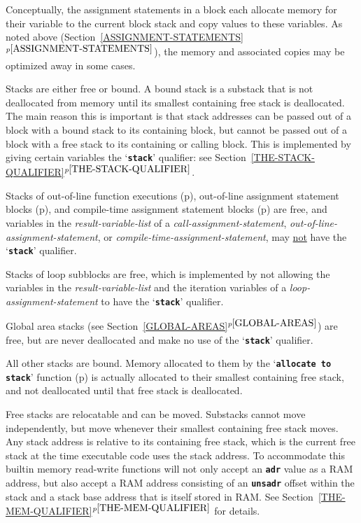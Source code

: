 \documentclass[12pt]{article}
\newcommand{\TT}[1]{{\tt \bfseries #1}}
\newcommand{\itemref}[1]{\ref{#1}$^{p\pageref{#1}}$}
\newcommand{\pagref}[1]{p\pageref{#1}}
\begin{document}
Conceptually, the assignment statements in a block each allocate memory for
their variable to the current block stack and copy values to these
variables.  As noted above (Section~\itemref{ASSIGNMENT-STATEMENTS}),
the memory and associated copies may be
optimized away in some cases.

Stacks are either free or bound.\label{FREE-STACK}
A bound stack is a substack that is
not deallocated from memory until its smallest containing free stack is
deallocated.  The main reason this is important is that stack addresses
can be passed out of a block with a bound stack to its containing block,
but cannot be passed out of a block with a free stack to its containing
or calling block.  This is implemented by giving certain
variables the `\TT{stack}' qualifier: see
Section~\itemref{THE-STACK-QUALIFIER}.

Stacks of out-of-line function executions
(\pagref{OUT-OF-LINE-FUNCTIONS}),
out-of-line assignment statement blocks
(\pagref{OUT-OF-LINE-ASSIGNMENT-STATEMENTS}),
and
compile-time assignment statement blocks
(\pagref{COMPILE-TIME-ASSIGNMENT-STATEMENTS})
are free, and variables in the {\em result-variable-list}
of a {\em call-assignment-statement},
{\em out-of-line-assignment-statement}, or
{\em compile-time-assignment-statement},
may \underline{not} have the `\TT{stack}' qualifier.

Stacks of loop subblocks are free,
which is implemented by not
allowing the variables in the {\em result-variable-list}
and the iteration variables
of a {\em loop-assignment-statement} to have the `\TT{stack}'
qualifier.

Global area stacks (see Section~\itemref{GLOBAL-AREAS}) are free,
but are never deallocated and make no use of the `\TT{stack}'
qualifier.

All other stacks are bound.  Memory allocated to them
by the `\TT{allocate to stack}' function (\pagref{ALLOCATE-TO-STACK})
is actually
allocated to their smallest containing free stack, and not deallocated
until that free stack is deallocated.

Free stacks are relocatable and can be moved.
Substacks cannot move independently,
but move whenever their smallest containing free stack moves.
Any stack address is relative to its containing free stack,
which is the current free stack at the time executable code uses
the stack address.  To accommodate this builtin memory read-write
functions will not only accept an \TT{adr} value as a RAM address,
but also accept a RAM address consisting of an \TT{unsadr}
offset within the stack and a stack base address that is itself
stored in RAM.  See Section~\itemref{THE-MEM-QUALIFIER} for details.
\end{document}
